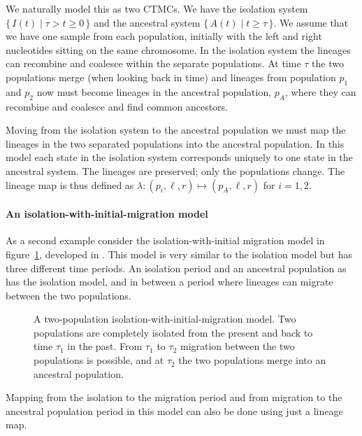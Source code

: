 We naturally model this as two CTMCs. We have the isolation system $\{\,I(t)\;|\;\tau > t \geq 0\,\}$ and the ancestral system $\{\,A(t)\;|\;t\geq\tau\,\}$. We assume that we have one sample from each population, initially with the left and right nucleotides sitting on the same chromosome. In the isolation system the lineages can recombine and coalesce within the separate populations. At time $\tau$ the two populations merge (when looking back in time) and lineages from population $p_1$ and $p_2$ now must become lineages in the ancestral population, $p_A$, where they can recombine and coalesce and find common ancestors.

Moving from the isolation system to the ancestral population we must map the lineages in the two separated populations into the ancestral population. In this model each state in the isolation system corresponds uniquely to one state in the ancestral system. The lineages are preserved; only the populations change. The lineage map is thus defined as $\lambda: (p_i,\ell,r) \mapsto (p_A,\ell,r)$ for $i=1,2$.


\paragraph{An isolation-with-initial-migration model}

As a second example consider the isolation-with-initial migration model in figure~\ref{fig:demographic-model-IIM-model}, developed in \cite{Mailund:2012ew}. This model is very similar to the isolation model but has three different time periods. An isolation period and an ancestral population as has the isolation model, and in between a period where lineages can migrate between the two populations.

\begin{figure}[tb]
  \caption{A two-population isolation-with-initial-migration model. Two populations are completely isolated from the present and back to time $\tau_1$ in the past. From $\tau_1$ to $\tau_2$ migration between the two populations is possible, and at $\tau_2$ the two populations merge into an ancestral population.}
  \label{fig:demographic-model-IIM-model}
\end{figure}

Mapping from the isolation to the migration period and from migration to the ancestral population period in this model can also be done using just a lineage map.

